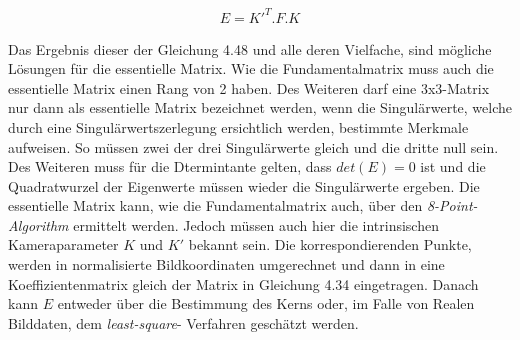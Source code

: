 \begin{gather}
E = K'^T.F.K
\end{gather}

Das Ergebnis dieser der Gleichung 4.48 und alle deren Vielfache, sind mögliche Lösungen für die essentielle Matrix. Wie die Fundamentalmatrix muss auch die essentielle Matrix einen Rang von 2 haben. Des Weiteren darf eine 3x3-Matrix nur dann als essentielle Matrix bezeichnet werden, wenn die Singulärwerte, welche durch eine Singulärwertszerlegung ersichtlich werden, bestimmte Merkmale aufweisen. So müssen zwei der drei Singulärwerte gleich und die dritte null sein\cite{HZ}. Des Weiteren muss für die Dtermintante gelten, dass $det(E) = 0$ ist und die Quadratwurzel der Eigenwerte müssen wieder die Singulärwerte ergeben. Die essentielle Matrix kann, wie die Fundamentalmatrix auch, über den \textit{8-Point-Algorithm} ermittelt werden. Jedoch müssen auch hier die intrinsischen Kameraparameter $K$ und $K'$ bekannt sein. Die korrespondierenden Punkte, werden in normalisierte Bildkoordinaten umgerechnet und dann in eine Koeffizientenmatrix gleich der Matrix in Gleichung 4.34 eingetragen. Danach kann $E$ entweder über die Bestimmung des Kerns oder, im Falle von Realen Bilddaten, dem \textit{least-square}- Verfahren geschätzt werden\cite{HZ,Ferid}.

%
%
%

